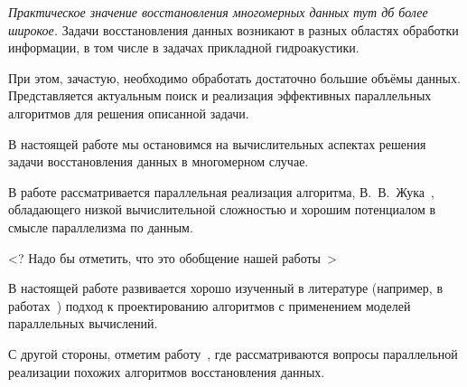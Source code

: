 

\label{sec:func_recv_intro}

\emph{Практическое значение восстановления многомерных данных тут дб более широкое.}
Задачи восстановления данных возникают в разных областях обработки информации,
в том числе в задачах прикладной гидроакустики. 


При этом, зачастую, необходимо обработать достаточно большие объёмы данных.
Представляется актуальным поиск и реализация эффективных параллельных алгоритмов
для решения описанной задачи.

В настоящей работе мы остановимся на вычислительных аспектах
решения задачи восстановления данных в многомерном случае. 


В работе рассматривается параллельная реализация
алгоритма,
В.~В.~Жука~\cite{book_Zhuk},
обладающего низкой вычислительной сложностью
и хорошим потенциалом в смысле параллелизма по данным. 

<? Надо бы отметить, что это обобщение нашей работы~\cite{my_paper_LETI_21}>



В настоящей работе развивается
хорошо изученный в литературе
(например, в работах~\cite{paper_Val_BSP_90, paper_BSPStreaming,  paper_McColl_Tis})
подход к проектированию
алгоритмов с применением моделей параллельных вычислений.


С другой стороны, отметим работу~\cite{paper_Mas_recv},
где рассматриваются вопросы параллельной реализации
похожих алгоритмов восстановления данных.









